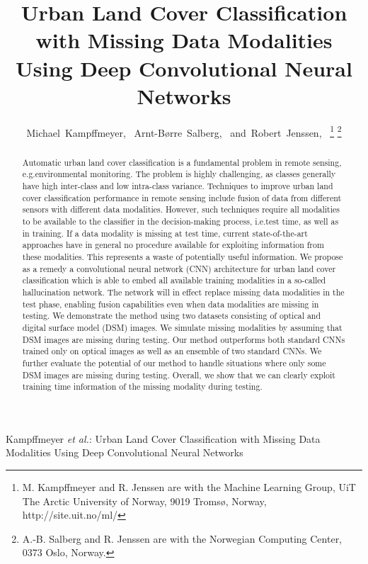 \documentclass[journal]{IEEEtran}
\begin{document}
\title{Urban Land Cover Classification with Missing Data Modalities Using Deep Convolutional Neural Networks}

\author{Michael~Kampffmeyer,~
        Arnt-B{\o}rre~Salberg,~
        and~Robert~Jenssen,~%
\thanks{M. Kampffmeyer and R. Jenssen are with the Machine Learning Group, UiT The Arctic University of Norway, 9019 Troms{\o}, Norway, http://site.uit.no/ml/}%
\thanks{A.-B. Salberg and R. Jenssen are with the Norwegian Computing Center, 0373 Oslo, Norway.}%
}

\markboth{}%
{Kampffmeyer \MakeLowercase{\textit{et al.}}: Urban Land Cover Classification with Missing Data Modalities Using Deep Convolutional Neural Networks}

\maketitle

\begin{abstract}
Automatic urban land cover classification is a fundamental problem in remote sensing, e.g.\for environmental monitoring. The problem is highly challenging, as classes generally have high inter-class and low intra-class variance. Techniques to improve urban land cover classification performance in remote sensing include fusion of data from different sensors with different data modalities. However, such techniques require all modalities to be available to the classifier in the decision-making process, i.e.\at test time, as well as in training. If a data modality is missing at test time, current state-of-the-art approaches have in general no procedure available for exploiting information from these modalities. This represents a waste of potentially useful information. We propose as a remedy a convolutional neural network (CNN) architecture for urban land cover classification which is able to embed all available training modalities in a so-called hallucination network. The network will in effect replace missing data modalities in the test phase, enabling fusion capabilities even when data modalities are missing in testing. We demonstrate the method using two datasets consisting of optical and digital surface model (DSM) images. We simulate missing modalities by assuming that DSM images are missing during testing. Our method outperforms both standard CNNs trained only on optical images as well as an ensemble of two standard CNNs. We further evaluate the potential of our method to handle situations where only some DSM images are missing during testing. Overall, we show that we can clearly exploit training time information of the missing modality during testing.
\end{abstract}
\end{document}
